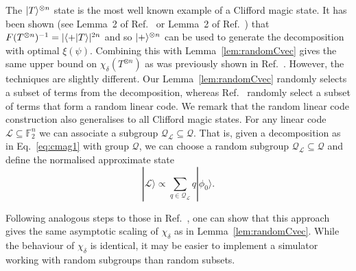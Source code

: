 The $\vert T\rangle^{\otimes n}$ state is the most well known example of a Clifford magic state.  It has been shown (see Lemma~2 of Ref.~\cite{Campbell11} or Lemma~2 of Ref.~\cite{bravyi2016improved}) that  $F(T^{\otimes n})^{-1}=|\langle +\vert T\rangle|^{2n}$ and so $\vert+\rangle^{\otimes n}$ can be used to generate the decomposition with optimal $\xi(\psi)$.  Combining this with Lemma~\ref{lem:randomCvec} gives the same upper bound on $\chi_\delta(T^{\otimes n})$ as was previously shown in Ref.~\cite{bravyi2016improved}.   However, the techniques are slightly different.  Our Lemma~\ref{lem:randomCvec} randomly selects a subset of terms from the decomposition, whereas Ref.~\cite{bravyi2016improved} randomly select a subset of terms that form a random linear code.  We remark that the random linear code construction also generalises to all Clifford magic states. For any linear code $\mathcal{L} \subseteq \mathbb{F}_2^n$ we can associate a subgroup $\mathcal{Q}_\mathcal{L} \subseteq \mathcal{Q}$.  That is, given a decomposition as in Eq.~\eqref{eq:cmag1} with group $\mathcal{Q}$, we can choose a random subgroup $\mathcal{Q_L} \subseteq \mathcal{Q}$ and define the normalised approximate state 
\begin{equation}
	|\mathcal{L} \rangle \propto \sum_{q\in \mathcal{Q_L}}q|\phi_0\rangle .
\label{eq:cmag}
\end{equation}



Following analogous steps to those in Ref.~\cite{bravyi2016improved}, one can show that this approach gives the same asymptotic scaling of $\chi_\delta$ as in Lemma~\ref{lem:randomCvec}.  While the behaviour of $\chi_\delta$  is identical, it may be easier to implement a simulator working with random subgroups than random subsets. 

